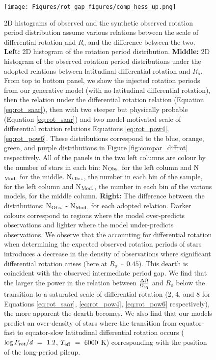 \begin{figure}
\centering
 \texttt{[image: Figures/rot\_gap\_figures/comp\_hess\_up.png]}
 \caption[2D histograms of observed and the synthetic observed rotation period distribution assuming various relations between the scale of differential rotation and $R_o$ and the difference between the two.]{
2D histograms of observed and the synthetic observed rotation period distribution assume various relations between the scale of differential rotation and $R_o$ and the difference between the two.
\textbf{Left:} 2D histogram of the \citet{mcquillan_rotation_2014} rotation period distribution.
\textbf{Middle:} 2D histogram of the observed rotation period distributions under the adopted relations between latitudinal differential rotation and $R_o$. From top to bottom panel, we show the injected rotation periods from our generative model (with no latitudinal differential rotation), then the relation under the \citet{saar_starspots_2011} differential rotation relation (Equation \ref{eq:rot_saar}), then with two steeper but physically probable (Equation \ref{eq:rot_saar}) and two model-motivated \citep{brun_powering_2022} scale of differential rotation relations Equations \ref{eq:rot_pow4}, \ref{eq:rot_pow6}.
These distributions correspond to the blue, orange, green, and purple distributions in Figure \ref{fig:compar_diffrot} respectively.
All of the panels in the two left columns are colour by the number of stars in each bin: N$_{\rm{Obs.}}$ for the left column and N$_{\rm{Mod.}}$ for the middle.
N$_{\rm{Obs.}}$, the number in each bin of the \citet{mcquillan_rotation_2014} sample, for the left column and N$_{\rm{Mod.}}$, the number in each bin of the various models, for the middle column.
\textbf{Right:} The difference between the distributions: N$_{\rm{Obs.}}$ - N$_{\rm{Mod.}}$ for each adopted relation.
Darker colours correspond to regions where the model over-predicts observations and lighter where the model under-predicts observations. We observe that the accounting for differential rotation when determining the expected observed rotation periods of stars introduces a decrease in the density of observations where significant differential rotation arises (here at $R_o \sim 0.45$). This dearth is coincident with the observed intermediate period gap. We find that the larger the power in the relation between $\frac{\Delta\Omega}{\Omega_{\rm{eq}}}$ and $R_o$ below the transition to a saturated scale of differential rotation (2, 4, and 8 for Equations \ref{eq:rot_saar}, \ref{eq:rot_pow4}, \ref{eq:rot_pow6} respectively), the more apparent the dearth becomes. We also find that our models predict an over-density of stars where the transition from equator-fast to equator-slow latitudinal differential rotation occurs ($\log P_{\rm{rot}}/d \ = \ 1.2$, $T_{\rm{eff}} \ = \ 6000$ K) corresponding with the position of the long-period pileup.}
 \label{fig:comp_hess}
\end{figure}

